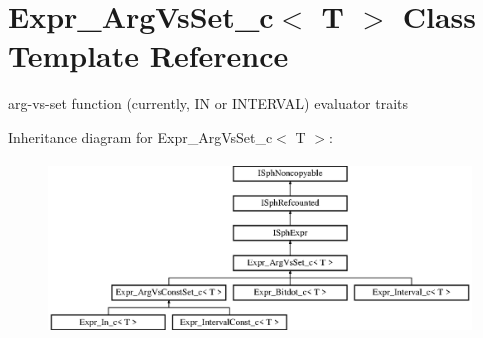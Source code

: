 \hypertarget{classExpr__ArgVsSet__c}{\section{Expr\-\_\-\-Arg\-Vs\-Set\-\_\-c$<$ T $>$ Class Template Reference}
\label{classExpr__ArgVsSet__c}
}


arg-\/vs-\/set function (currently, I\-N or I\-N\-T\-E\-R\-V\-A\-L) evaluator traits  


Inheritance diagram for Expr\-\_\-\-Arg\-Vs\-Set\-\_\-c$<$ T $>$\-:\begin{figure}[H]
\begin{center}
\leavevmode
\includegraphics[height=4.565217cm]{classExpr__ArgVsSet__c}
\end{center}
\end{figure}

